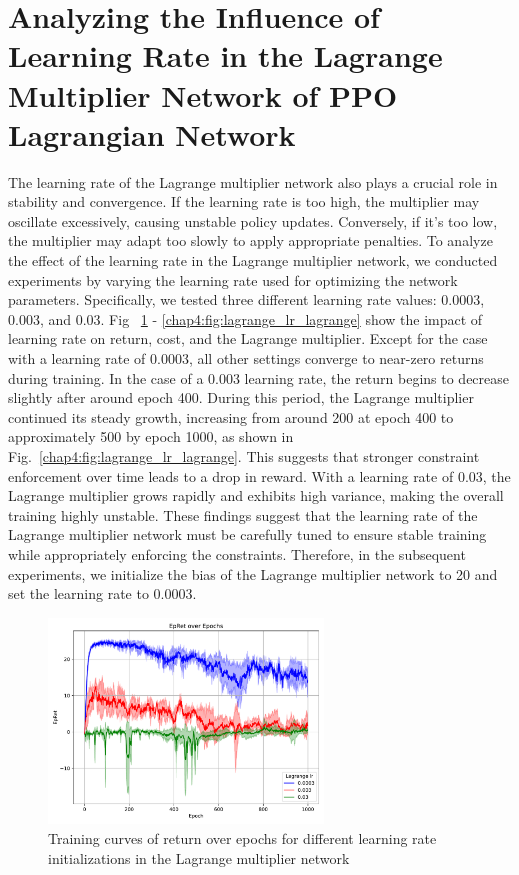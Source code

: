 \section{Analyzing the Influence of Learning Rate in the Lagrange Multiplier Network of PPO Lagrangian Network} \label{chap4:sec:experiments:lagrange_lr}

The learning rate of the Lagrange multiplier network also plays a crucial role in stability and convergence. 
If the learning rate is too high, the multiplier may oscillate excessively, causing unstable policy updates. 
Conversely, if it’s too low, the multiplier may adapt too slowly to apply appropriate penalties.
To analyze the effect of the learning rate in the Lagrange multiplier network, we conducted experiments by varying the learning rate used for optimizing the network parameters.
Specifically, we tested three different learning rate values: 0.0003, 0.003, and 0.03.
Fig ~\ref{chap4:fig:lagrange_lr_return} - \ref{chap4:fig:lagrange_lr_lagrange} show the impact of learning rate on return, cost, and the Lagrange multiplier.
Except for the case with a learning rate of 0.0003, all other settings converge to near-zero returns during training.
In the case of a 0.003 learning rate, the return begins to decrease slightly after around epoch 400.
During this period, the Lagrange multiplier continued its steady growth, increasing from around 200 at epoch 400 to approximately 500 by epoch 1000, as shown in Fig.~\ref{chap4:fig:lagrange_lr_lagrange}.
This suggests that stronger constraint enforcement over time leads to a drop in reward.
With a learning rate of 0.03, the Lagrange multiplier grows rapidly and exhibits high variance, making the overall training highly unstable.
These findings suggest that the learning rate of the Lagrange multiplier network must be carefully tuned to ensure stable training while appropriately enforcing the constraints.
Therefore, in the subsequent experiments, we initialize the bias of the Lagrange multiplier network to 20 and set the learning rate to 0.0003.

\begin{figure}[h]
  \centering
  \includegraphics[width=0.65\textwidth]{imgs/chap4/lagrange_lr/return.pdf}
  \caption{Training curves of return over epochs for different learning rate initializations in the Lagrange multiplier network}
  \label{chap4:fig:lagrange_lr_return}
\end{figure}

